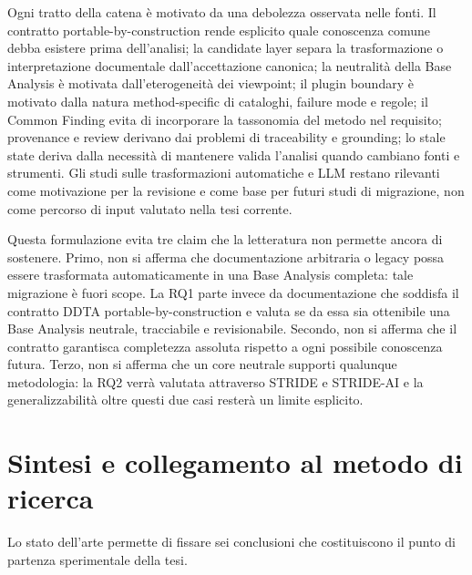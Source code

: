 \documentclass[12pt,a4paper,oneside]{report}
\begin{document}
\begin{center}
\end{center}

Ogni tratto della catena è motivato da una debolezza osservata nelle fonti. Il contratto portable-by-construction rende esplicito quale conoscenza comune debba esistere prima dell'analisi; la candidate layer separa la trasformazione o interpretazione documentale dall'accettazione canonica; la neutralità della Base Analysis è motivata dall'eterogeneità dei viewpoint; il plugin boundary è motivato dalla natura method-specific di cataloghi, failure mode e regole; il Common Finding evita di incorporare la tassonomia del metodo nel requisito; provenance e review derivano dai problemi di traceability e grounding; lo stale state deriva dalla necessità di mantenere valida l'analisi quando cambiano fonti e strumenti. Gli studi sulle trasformazioni automatiche e LLM restano rilevanti come motivazione per la revisione e come base per futuri studi di migrazione, non come percorso di input valutato nella tesi corrente.

Questa formulazione evita tre claim che la letteratura non permette ancora di sostenere. Primo, non si afferma che documentazione arbitraria o legacy possa essere trasformata automaticamente in una Base Analysis completa: tale migrazione è fuori scope. La RQ1 parte invece da documentazione che soddisfa il contratto DDTA portable-by-construction e valuta se da essa sia ottenibile una Base Analysis neutrale, tracciabile e revisionabile. Secondo, non si afferma che il contratto garantisca completezza assoluta rispetto a ogni possibile conoscenza futura. Terzo, non si afferma che un core neutrale supporti qualunque metodologia: la RQ2 verrà valutata attraverso STRIDE e STRIDE-AI e la generalizzabilità oltre questi due casi resterà un limite esplicito.

\section{Sintesi e collegamento al metodo di ricerca}

Lo stato dell'arte permette di fissare sei conclusioni che costituiscono il punto di partenza sperimentale della tesi.
\end{document}
